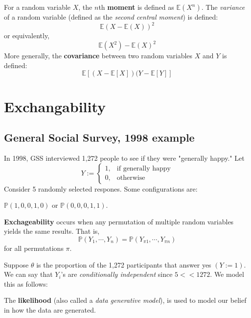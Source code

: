 \documentclass[titlepage, 12pt, leqno]{article}
\begin{document}
\begin{definition}
     For a random variable $X$, the $n$th \textbf{moment} is defined as
     $ \mathbb{E}(X^{n})$. The \textit{variance} of a random variable (defined as
     the \textit{second central moment}) is defined:
     \[
         \mathbb{E}(X- \mathbb{E}(X))^{2}
     \]
     or equivalently,
     \[
         \mathbb{E}(X^{2}) - \mathbb{E}(X)^{2}
     \]
     More generally, the \textbf{covariance} between two random variables $X$ and
     $Y$ is defined:
     \[
         \mathbb{E}[(X - \mathbb{E}[X])(Y - \mathbb{E}[Y]]
     \]
\end{definition}

\pagebreak
\section{Exchangability}
\subsection{General Social Survey, 1998 example}

In 1998, GSS interviewed 1,272 people to see if they were "generally happy." Let
\[
    Y := 
    \begin{cases}
        1, & \text{if }\text{generally happy} \\
        0, & \text{otherwise}
    \end{cases}
\]
Consider 5 randomly selected respones. Some configurations are:

$\mathbb{P}(1,0,0,1,0)$ or $\mathbb{P}(0,0,0,1,1)$.

\begin{definition}
    \textbf{Exchageability} occurs when any permutation of multiple random 
    variables yields the same results. That is,
    \[
        \mathbb{P}(Y_1, \cdots ,Y_n) = \mathbb{P}(Y_{\pi 1}, \cdots , Y_{\pi n})
    \]
    for all permutations $\pi$.
\end{definition}

Suppose $\theta$ is the proportion of the 1,272 participants that answer yes 
$(Y :=1)$. We can say that $Y_i$'s are \textit{conditionally independent} since
$5 << 1272$. We model this as follows:

\begin{definition}
    The \textbf{likelihood} (also called a \textit{data generative model}), is
    used to model our belief in how the data are generated.
\end{definition}
\end{document}
